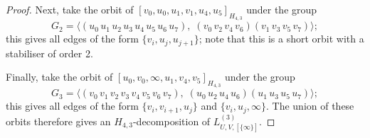 \begin{subappendices}
\begin{proof}
Next, take the orbit of $[v_0, u_0, u_1, v_1, u_4, u_5]_{H_{4,3}}$ under the group
\[
    G_2 = \langle (u_0 \, u_1 \, u_2 \, u_3 \, u_4 \, u_5 \, u_6 \, u_7), \;
    (v_0 \, v_2 \, v_4 \, v_6) (v_1 \, v_3 \, v_5 \, v_7)\rangle;
\]
this gives all edges of the form $\{v_i, u_j, u_{j+1}\}$; note that this is a
short orbit with a stabiliser of order 2.

Finally, take the orbit of $[u_0, v_0, \infty, u_1, v_4, v_5]_{H_{4,3}}$ under the group
\[
    G_3 = \langle (v_0 \, v_1 \, v_2 \, v_3 \, v_4 \, v_5 \, v_6 \, v_7), \;
    (u_0 \, u_2 \, u_4 \, u_6) (u_1 \, u_3 \, u_5 \, u_7)\rangle;
\]
this gives all edges of the form $\{v_i, v_{i+1}, u_j\}$ and $\{v_i, u_j, \infty\}$.
The union of these orbits therefore gives an ${H_{4,3}}$-decomposition of $L_{U,V,[\{\infty\}]}^{(3)}$.
\end{proof}

\end{subappendices}
